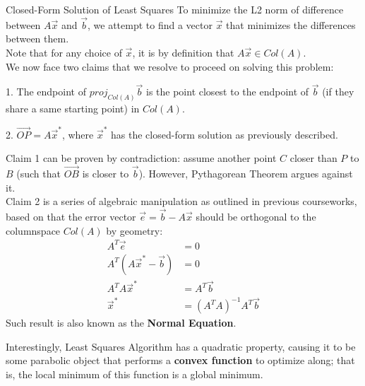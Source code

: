 \begin{ln-explain}{Closed-Form Solution of Least Squares}{}
    To minimize the L2 norm of difference between $A \vec{x}$ and $\vec{b}$, we attempt to find a vector $\vec{x}$ that minimizes the differences between them. \\
    Note that for any choice of $\vec{x}$, it is by definition that $A \vec{x} \in Col(A)$. \\

    We now face two claims that we resolve to proceed on solving this problem:
    \begin{bindenum}
        \item[1.] The endpoint of ${proj}_{Col(A)} \vec{b}$ is the point closest to the endpoint of $\vec{b}$ (if they share a same starting point) in $Col(A)$.
        \item[2.] $\vec{OP} = A \vec{x}^*$, where $\vec{x}^*$ has the closed-form solution as previously described.
    \end{bindenum}

    Claim 1 can be proven by contradiction: assume another point $C$ closer than $P$ to $B$ (such that $\vec{OB}$ is closer to $\vec{b}$). However, Pythagorean Theorem argues against it. \\
    Claim 2 is a series of algebraic manipulation as outlined in previous courseworks, based on that the error vector $\vec{e} = \vec{b} - A\vec{x}$ should be orthogonal to the columnspace $Col(A)$ by geometry:
    \begin{align*}
        A^T \vec{e} &= 0 \\
        A^T (A \vec{x}^* - \vec{b}) &= 0 \\
        A^T A \vec{x}^* &= A^T \vec{b} \\
        \vec{x}^* &= {(A^T A)}^{-1} A^T \vec{b}
    \end{align*}
    Such result is also known as the \textbf{Normal Equation}.
\end{ln-explain}

Interestingly, Least Squares Algorithm has a quadratic property, causing it to be some parabolic object that performs a \textbf{convex function} to optimize along; that is, the local minimum of this function is a global minimum.
